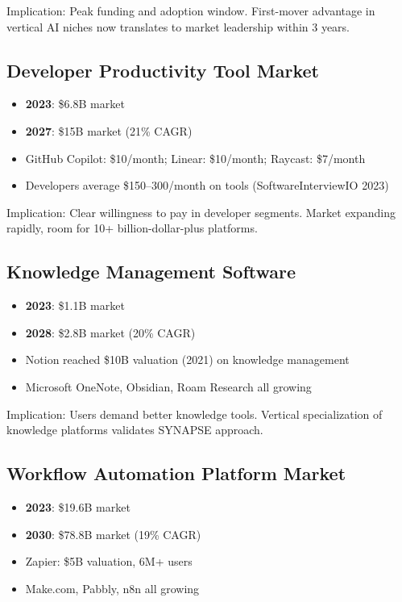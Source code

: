 \documentclass{report}
\begin{document}
Implication: Peak funding and adoption window. First-mover advantage in vertical AI niches now translates to market leadership within 3 years.

\subsection{Developer Productivity Tool Market}

\begin{itemize}
    \item \textbf{2023}: \$6.8B market
    \item \textbf{2027}: \$15B market (21\% CAGR)
    \item GitHub Copilot: \$10/month; Linear: \$10/month; Raycast: \$7/month
    \item Developers average \$150--300/month on tools (SoftwareInterviewIO 2023)
\end{itemize}

Implication: Clear willingness to pay in developer segments. Market expanding rapidly, room for 10+ billion-dollar-plus platforms.

\subsection{Knowledge Management Software}

\begin{itemize}
    \item \textbf{2023}: \$1.1B market
    \item \textbf{2028}: \$2.8B market (20\% CAGR)
    \item Notion reached \$10B valuation (2021) on knowledge management
    \item Microsoft OneNote, Obsidian, Roam Research all growing
\end{itemize}

Implication: Users demand better knowledge tools. Vertical specialization of knowledge platforms validates SYNAPSE approach.

\subsection{Workflow Automation Platform Market}

\begin{itemize}
    \item \textbf{2023}: \$19.6B market
    \item \textbf{2030}: \$78.8B market (19\% CAGR)
    \item Zapier: \$5B valuation, 6M+ users
    \item Make.com, Pabbly, n8n all growing
\end{itemize}
\end{document}
